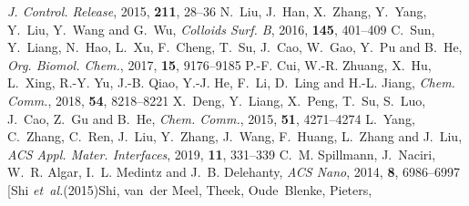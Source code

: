 \documentclass[twoside,twocolumn,9pt]{article}
\begin{document}
\begin{mcitethebibliography}{79}
  \emph{J. Control. Release}, 2015, \textbf{211}, 28--36\relax
\mciteBstWouldAddEndPuncttrue
\mciteSetBstMidEndSepPunct{\mcitedefaultmidpunct}
{\mcitedefaultendpunct}{\mcitedefaultseppunct}\relax
\EndOfBibitem
{}
N.~Liu, J.~Han, X.~Zhang, Y.~Yang, Y.~Liu, Y.~Wang and G.~Wu, \emph{Colloids
  Surf. B}, 2016, \textbf{145}, 401--409\relax
\mciteBstWouldAddEndPuncttrue
\mciteSetBstMidEndSepPunct{\mcitedefaultmidpunct}
{\mcitedefaultendpunct}{\mcitedefaultseppunct}\relax
\EndOfBibitem
{}
C.~Sun, Y.~Liang, N.~Hao, L.~Xu, F.~Cheng, T.~Su, J.~Cao, W.~Gao, Y.~Pu and
  B.~He, \emph{Org. Biomol. Chem.}, 2017, \textbf{15}, 9176--9185\relax
\mciteBstWouldAddEndPuncttrue
\mciteSetBstMidEndSepPunct{\mcitedefaultmidpunct}
{\mcitedefaultendpunct}{\mcitedefaultseppunct}\relax
\EndOfBibitem
{}
P.-F. Cui, W.-R. Zhuang, X.~Hu, L.~Xing, R.-Y. Yu, J.-B. Qiao, Y.-J. He, F.~Li,
  D.~Ling and H.-L. Jiang, \emph{Chem. Comm.}, 2018, \textbf{54},
  8218--8221\relax
\mciteBstWouldAddEndPuncttrue
\mciteSetBstMidEndSepPunct{\mcitedefaultmidpunct}
{\mcitedefaultendpunct}{\mcitedefaultseppunct}\relax
\EndOfBibitem
{}
X.~Deng, Y.~Liang, X.~Peng, T.~Su, S.~Luo, J.~Cao, Z.~Gu and B.~He, \emph{Chem.
  Comm.}, 2015, \textbf{51}, 4271--4274\relax
\mciteBstWouldAddEndPuncttrue
\mciteSetBstMidEndSepPunct{\mcitedefaultmidpunct}
{\mcitedefaultendpunct}{\mcitedefaultseppunct}\relax
\EndOfBibitem
{}
L.~Yang, C.~Zhang, C.~Ren, J.~Liu, Y.~Zhang, J.~Wang, F.~Huang, L.~Zhang and
  J.~Liu, \emph{ACS Appl. Mater. Interfaces}, 2019, \textbf{11}, 331--339\relax
\mciteBstWouldAddEndPuncttrue
\mciteSetBstMidEndSepPunct{\mcitedefaultmidpunct}
{\mcitedefaultendpunct}{\mcitedefaultseppunct}\relax
\EndOfBibitem
{}
C.~M. Spillmann, J.~Naciri, W.~R. Algar, I.~L. Medintz and J.~B. Delehanty,
  \emph{ACS Nano}, 2014, \textbf{8}, 6986--6997\relax
\mciteBstWouldAddEndPuncttrue
\mciteSetBstMidEndSepPunct{\mcitedefaultmidpunct}
{\mcitedefaultendpunct}{\mcitedefaultseppunct}\relax
\EndOfBibitem
\bibitem[Shi \emph{et~al.}(2015)Shi, van~der Meel, Theek, Oude~Blenke, Pieters,

\end{mcitethebibliography}
\end{document}
